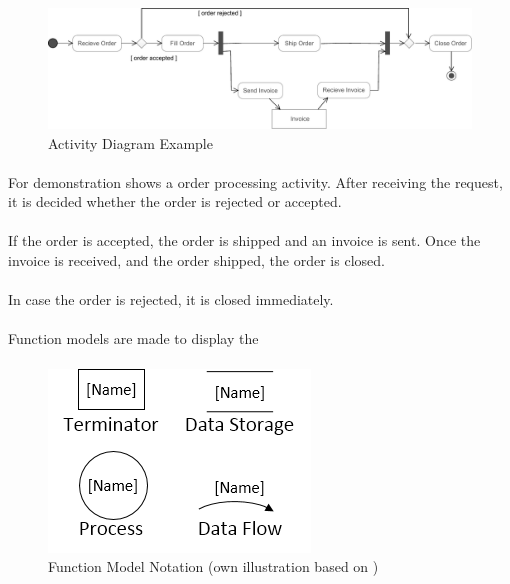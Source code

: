 \begin{figure}[H]
    \centering
    \includegraphics[width=\textwidth]{img/ActivityExample.pdf}
    \caption{Activity Diagram Example \parencite[380]{ObjectManagementGroup.01.03.2015}}\label{fig:adEx}
\end{figure}

\paragraph{} For demonstration  shows a order processing activity. After receiving the request, it is decided whether the order is rejected or accepted. 

\paragraph{} If the order is accepted, the order is shipped and an invoice is sent. Once the invoice is received, and the order shipped, the order is closed. 

\paragraph{} In case the order is rejected, it is closed immediately. 


\paragraph{} Function models are made to display the 

\paragraph{} 
\begin{figure}[H]
    \centering
    \includegraphics[scale=0.9]{img/fmSymb.png}
    \caption[Function Model Notation]{Function Model Notation (own illustration based on \cite[190]{Pohl.2007})}
    \label{fig:fmSymb}
\end{figure}


